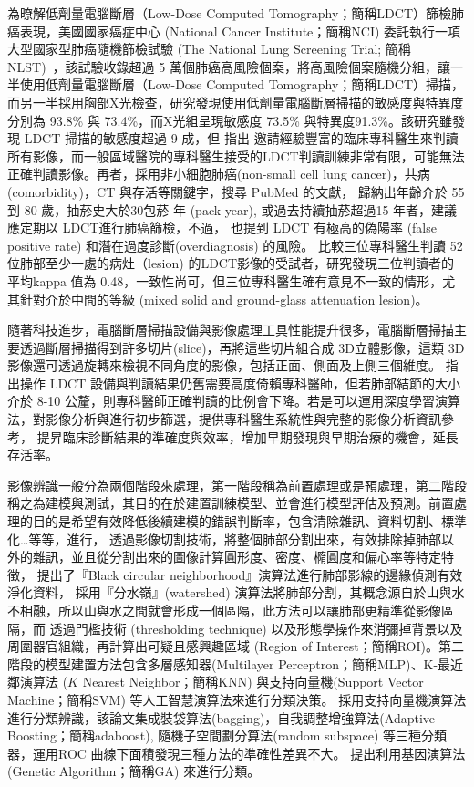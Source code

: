\documentclass[12pt, a4paper]{article} 				%
\begin{document}
為暸解低劑量電腦斷層（Low-Dose Computed Tomography；簡稱LDCT）篩檢肺癌表現，美國國家癌症中心 (National Cancer Institute；簡稱NCI) 委託執行一項大型國家型肺癌隨機篩檢試驗 (The National Lung Screening Trial; 簡稱 NLST)~\cite{Team2011}，該試驗收錄超過 5 萬個肺癌高風險個案，將高風險個案隨機分組，讓一半使用低劑量電腦斷層（Low-Dose Computed Tomography；簡稱LDCT）掃描，而另一半採用胸部X光檢查，研究發現使用低劑量電腦斷層掃描的敏感度與特異度分別為 93.8\% 與 73.4\%，而X光組呈現敏感度 73.5\% 與特異度91.3\%。該研究雖發現 LDCT 掃描的敏感度超過 9 成，但 \cite{Chudgar2015} 指出 \cite{Team2011} 邀請經驗豐富的臨床專科醫生來判讀所有影像，而一般區域醫院的專科醫生接受的LDCT判讀訓練非常有限，可能無法正確判讀影像。再者，採用非小細胞肺癌(non-small cell lung cancer)，共病(comorbidity)，CT 與存活等關鍵字，搜尋 PubMed 的文獻，\cite{Fabrikant2018} 歸納出年齡介於 55 到 80 歲，抽菸史大於30包菸-年 (pack-year), 或過去持續抽菸超過15 年者，建議應定期以 LDCT進行肺癌篩檢，不過，\cite{Fabrikant2018} 也提到 LDCT 有極高的偽陽率 (false positive rate) 和潛在過度診斷(overdiagnosis) 的風險。\cite{Kubo2016} 比較三位專科醫生判讀 52 位肺部至少一處的病灶（lesion) 的LDCT影像的受試者，研究發現三位判讀者的平均kappa 值為 0.48，一致性尚可，但三位專科醫生確有意見不一致的情形，尤其針對介於中間的等級 (mixed solid and ground-glass attenuation lesion)。

隨著科技進步，電腦斷層掃描設備與影像處理工具性能提升很多，電腦斷層掃描主要透過斷層掃描得到許多切片(slice)，再將這些切片組合成 3D立體影像，這類 3D 影像還可透過旋轉來檢視不同角度的影像，包括正面、側面及上側三個維度。\cite{Rubin2015} 指出操作 LDCT 設備與判讀結果仍舊需要高度倚賴專科醫師，但若肺部結節的大小介於 8-10 公釐，則專科醫師正確判讀的比例會下降。若是可以運用深度學習演算法，對影像分析與進行初步篩選，提供專科醫生系統性與完整的影像分析資訊參考， 提昇臨床診斷結果的準確度與效率，增加早期發現與早期治療的機會，延長存活率。

影像辨識一般分為兩個階段來處理，第一階段稱為前置處理或是預處理，第二階段稱之為建模與測試，其目的在於建置訓練模型、並會進行模型評估及預測。前置處理的目的是希望有效降低後續建模的錯誤判斷率，包含清除雜訊、資料切割、標準化…等等，進行，\cite{Farahani2015LungND} 透過影像切割技術，將整個肺部分割出來，有效排除掉肺部以外的雜訊，並且從分割出來的圖像計算圓形度、密度、橢圓度和偏心率等特定特徵，\cite{Veerakumar2016} 提出了『Black circular neighborhood』演算法進行肺部影線的邊緣偵測有效淨化資料，\cite{Heeneman2018} 採用『分水嶺』(watershed) 演算法將肺部分割，其概念源自於山與水不相融，所以山與水之間就會形成一個區隔，此方法可以讓肺部更精準從影像區隔，而 \cite{Rendon-Gonzalez2016} 透過門檻技術 (thresholding technique) 以及形態學操作來消彌掉背景以及周圍器官組織，再計算出可疑且感興趣區域 (Region of Interest；簡稱ROI)。第二階段的模型建置方法包含多層感知器(Multilayer Perceptron；簡稱MLP)、K-最近鄰演算法 ($K$ Nearest Neighbor；簡稱KNN) 與支持向量機(Support Vector Machine；簡稱SVM) 等人工智慧演算法來進行分類決策。\cite{Rendon-Gonzalez2016} 採用支持向量機演算法進行分類辨識，該論文集成裝袋算法(bagging)，自我調整增強算法(Adaptive Boosting；簡稱adaboost), 隨機子空間劃分算法(random subspace) 等三種分類器，運用ROC 曲線下面積發現三種方法的準確性差異不大。\cite{Heeneman2018} 提出利用基因演算法 (Genetic Algorithm；簡稱GA) 來進行分類。
\end{document}
